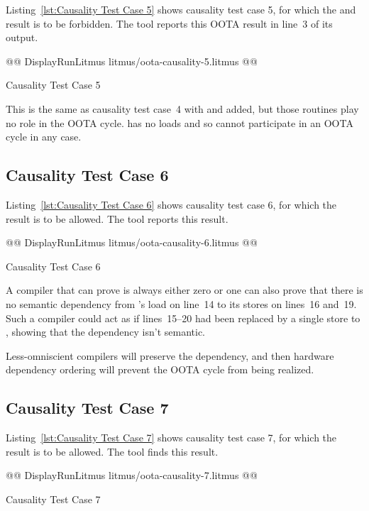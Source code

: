 \documentclass[10]{article}
\begin{document}
Listing~\ref{lst:Causality Test Case 5}
shows causality test case 5, for which the  and 
result is to be forbidden.
The  tool reports this OOTA result in line~3 of its output.

\begin{listing}[tbp]
@@ DisplayRunLitmus litmus/oota-causality-5.litmus @@
\caption{Causality Test Case 5}
\label{lst:Causality Test Case 5}
\end{listing}

This is the same as causality test case~4 with  and 
added, but those routines play no role in the OOTA cycle.
 has no loads and so cannot participate in an OOTA cycle in
any case.

\subsection{Causality Test Case 6}
\label{app:Causality Test Case 6}

Listing~\ref{lst:Causality Test Case 6}
shows causality test case 6, for which the 
result is to be allowed.
The  tool reports this result.

\begin{listing}[tbp]
@@ DisplayRunLitmus litmus/oota-causality-6.litmus @@
\caption{Causality Test Case 6}
\label{lst:Causality Test Case 6}
\end{listing}

A compiler that can prove  is always either
zero or one can also prove that there is no semantic dependency
from 's load on line~14 to its stores on lines~16 and~19.
Such a compiler could act as if lines~15--20 had been replaced
by a single store to , showing that the dependency isn't
semantic.

Less-omniscient compilers will preserve the dependency, and then
hardware dependency ordering will prevent the OOTA cycle from
being realized.

\subsection{Causality Test Case 7}
\label{app:Causality Test Case 7}

Listing~\ref{lst:Causality Test Case 7}
shows causality test case 7, for which the 
result is to be allowed.
The  tool finds this result.

\begin{listing}[tbp]
@@ DisplayRunLitmus litmus/oota-causality-7.litmus @@
\caption{Causality Test Case 7}
\label{lst:Causality Test Case 7}
\end{listing}
\end{document}
